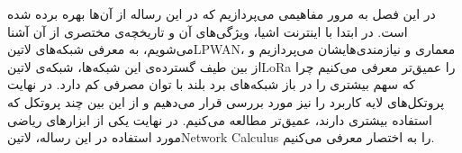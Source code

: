 
در این فصل به مرور مفاهیمی می‌پردازیم که در این رساله از آن‌ها بهره برده شده است. در ابتدا با اینترنت اشیا، ویژگی‌های آن و تاریخچه‌ی مختصری از آن آشنا می‌شویم،
به معرفی شبکه‌های ‌لاتین{LPWAN}، معماری و نیازمندی‌هایشان
می‌پردازیم و از بین طیف گسترده‌ی این شبکه‌ها، شبکه‌ی ‌لاتین{LoRa} را عمیق‌تر
معرفی می‌کنیم چرا که سهم بیشتری را در باز شبکه‌های برد بلند با توان مصرفی کم دارد.
در نهایت پروتکل‌های لایه کاربرد را نیز مورد بررسی قرار می‌دهیم و از این بین چند پروتکل که استفاده بیشتری دارند، عمیق‌تر مطالعه می‌کنیم.
در نهایت یکی از ابزارهای ریاضی مورد استفاده در این رساله، ‌لاتین{Network Calculus} را به اختصار معرفی می‌کنیم.






